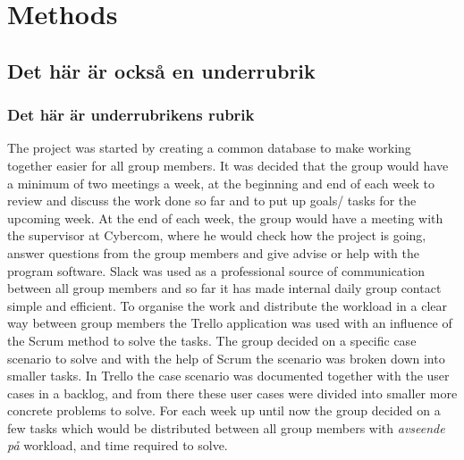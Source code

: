\section{Methods}
\subsection{Det här är också en underrubrik}
\subsubsection{Det här är underrubrikens rubrik}

\bigskip 

The project was started by creating a common database to make working together easier for all group members. It was decided that the group would have a minimum of two meetings a week, at the beginning and end of each week to review and discuss the work done so far and to put up goals/ tasks for the upcoming week. At the end of each week, the group would have a meeting with the supervisor at Cybercom, where he would check how the project is going, answer questions from the group members and give advise or help with the program software. Slack was used as a professional source of communication between all group members and so far it has made internal daily group contact simple and efficient. To organise the work and distribute the workload in a clear way between group members the Trello application was used with an influence of the Scrum method to solve the tasks. The group decided on  a specific case scenario to solve and with the help of Scrum the scenario was broken down into smaller tasks. In Trello the case scenario was documented together with the user cases in a backlog, and from there these user cases were divided  into smaller more concrete problems to solve. For each week up until now the group decided on a few tasks which would be distributed between  all group members with \textit{avseende på} workload,  and time required to solve.
